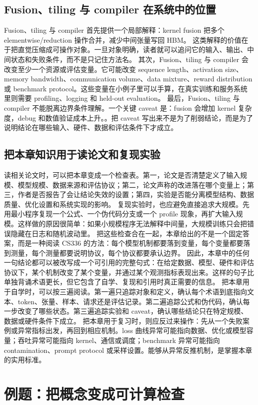 \documentclass[a4paper]{article}
\begin{document}
\subsection{Fusion、tiling 与 compiler 在系统中的位置}
Fusion、tiling 与 compiler 首先提供一个局部解释：kernel fusion 把多个 elementwise/reduction 操作合并，减少中间张量写回 HBM。 这类解释的价值在于把直觉压缩成可操作对象。一旦对象明确，读者就可以追问它的输入、输出、中间状态和失败条件，而不是只记住方法名。
其次，Fusion、tiling 与 compiler 会改变至少一个资源或评估变量。它可能改变 sequence length、activation size、memory bandwidth、communication volume、data mixture、reward distribution 或 benchmark protocol。这些变量在小例子里可以手算，在真实训练和服务系统里则需要 profiling、logging 和 held-out evaluation。
最后，Fusion、tiling 与 compiler 不能脱离边界条件理解。一个关键 caveat 是：fusion 会增加 kernel 复杂度，debug 和数值验证成本上升。。把 caveat 写出来不是为了削弱结论，而是为了说明结论在哪些输入、硬件、数据和评估条件下才成立。
\subsection{把本章知识用于读论文和复现实验}
读相关论文时，可以把本章变成一个检查表。第一，论文是否清楚定义了输入规模、模型规模、数据来源和评估协议；第二，论文声称的改进落在哪个变量上；第三，作者是否报告了会让结论失效的设置；第四，实验是否能分离模型结构、数据质量、优化设置和系统实现的影响。
复现实验时，也应避免直接追求大规模。先用最小程序复现一个公式、一个伪代码分支或一个 profile 现象，再扩大输入规模。这样做的原因很简单：如果小规模程序无法解释中间量，大规模训练只会把错误隐藏在日志和随机波动里。
把这些检查合在一起，本章给出的不是一个固定答案，而是一种阅读 CS336 的方法：每个模型机制都要落到变量，每个变量都要落到测量，每个测量都要说明协议，每个协议都要承认边界。
因此，本章中的任何一句结论都可以被改写成一个可引用的完整句式：在给定数据、模型、硬件和评估协议下，某个机制改变了某个变量，并通过某个观测指标表现出来。这样的句子比单独背诵术语更长，但它包含了自学、复现和引用时真正需要的信息。
把本章用于自学时，可以按三遍阅读。第一遍只追踪对象和定义，确认每个术语到底指向文本、token、张量、样本、请求还是评估记录。第二遍追踪公式和伪代码，确认每一步改变了哪些状态。第三遍追踪实验和 caveat，确认哪些结论只在特定规模、数据或硬件条件下成立。
把本章用于复习时，则应反过来操作：先从一个失败案例或异常指标出发，再回到相应机制。loss 曲线异常可能指向数据、优化或模型容量；吞吐异常可能指向 kernel、通信或调度；benchmark 异常可能指向 contamination、prompt protocol 或采样设置。能够从异常反推机制，是掌握本章的实用标准。
\section{例题：把概念变成可计算检查}
\end{document}

